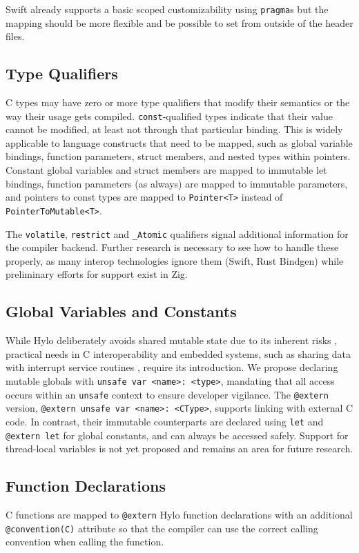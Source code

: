 Swift already supports a basic scoped customizability using \texttt{pragma}s but the mapping should be more flexible and be possible to set from outside of the header files.

\subsection{Type Qualifiers}
C types may have zero or more type qualifiers that modify their semantics or the way their usage gets compiled. \texttt{const}-qualified types indicate that their value cannot be modified, at least not through that particular binding. This is widely applicable to language constructs that need to be mapped, such as global variable bindings, function parameters, struct members, and nested types within pointers. Constant global variables and struct members are mapped to immutable let bindings, function parameters (as always) are mapped to immutable parameters, and pointers to const types are mapped to \texttt{Pointer<T>} instead of \texttt{PointerToMutable<T>}.

The \texttt{volatile}, \texttt{restrict} and \texttt{\_Atomic} qualifiers signal additional information for the compiler backend. Further research is necessary to see how to handle these properly, as many interop technologies ignore them (Swift, Rust Bindgen) while preliminary efforts for support exist in Zig\cite{zig-qualifiers}.

\subsection{Global Variables and Constants}
While Hylo deliberately avoids shared mutable state due to its inherent risks \cite{sharedmut}\cite{shared-mutable-state}, practical needs in C interoperability and embedded systems, such as sharing data with interrupt service routines \cite{rust-embedded-pain}, require its introduction. We propose declaring mutable globals with \texttt{unsafe var <name>: <type>}, mandating that all access occurs within an \texttt{unsafe} context to ensure developer vigilance. The \texttt{@extern} version, \texttt{@extern unsafe var <name>: <CType>}, supports linking with external C code. In contrast, their immutable counterparts are declared using \texttt{let} and \texttt{@extern let} for global constants, and can always be accessed safely. Support for thread-local variables is not yet proposed and remains an area for future research.

\subsection{Function Declarations}
C functions are mapped to \texttt{@extern} Hylo function declarations with an additional \texttt{@convention(C)} attribute so that the compiler can use the correct calling convention when calling the function.

